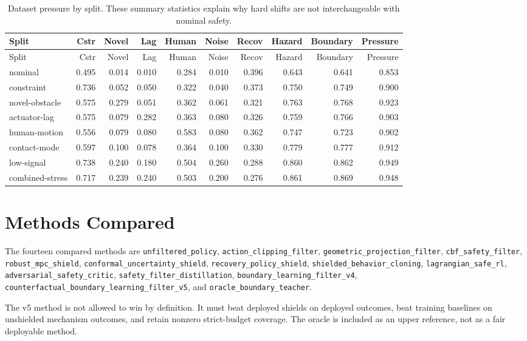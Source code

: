 \documentclass{article}
\begin{document}
\begingroup
\scriptsize
\begin{longtable}{@{}lrrrrrrrrr@{}}
\caption{Dataset pressure by split. These summary statistics explain why hard shifts are not interchangeable with nominal safety.}\\
\toprule
Split & Cstr & Novel & Lag & Human & Noise & Recov & Hazard & Boundary & Pressure \\
\midrule
\endfirsthead
\toprule
Split & Cstr & Novel & Lag & Human & Noise & Recov & Hazard & Boundary & Pressure \\
\midrule
\endhead
nominal & 0.495 & 0.014 & 0.010 & 0.284 & 0.010 & 0.396 & 0.643 & 0.641 & 0.853 \\
constraint & 0.736 & 0.052 & 0.050 & 0.322 & 0.040 & 0.373 & 0.750 & 0.749 & 0.900 \\
novel-obstacle & 0.575 & 0.279 & 0.051 & 0.362 & 0.061 & 0.321 & 0.763 & 0.768 & 0.923 \\
actuator-lag & 0.575 & 0.079 & 0.282 & 0.363 & 0.080 & 0.326 & 0.759 & 0.766 & 0.903 \\
human-motion & 0.556 & 0.079 & 0.080 & 0.583 & 0.080 & 0.362 & 0.747 & 0.723 & 0.902 \\
contact-mode & 0.597 & 0.100 & 0.078 & 0.364 & 0.100 & 0.330 & 0.779 & 0.777 & 0.912 \\
low-signal & 0.738 & 0.240 & 0.180 & 0.504 & 0.260 & 0.288 & 0.860 & 0.862 & 0.949 \\
combined-stress & 0.717 & 0.239 & 0.240 & 0.503 & 0.200 & 0.276 & 0.861 & 0.869 & 0.948 \\
\bottomrule
\end{longtable}
\endgroup


\section{Methods Compared}
The fourteen compared methods are \texttt{unfiltered\_policy}, \texttt{action\_clipping\_filter}, \texttt{geometric\_projection\_filter}, \texttt{cbf\_safety\_filter}, \texttt{robust\_mpc\_shield}, \texttt{conformal\_uncertainty\_shield}, \texttt{recovery\_policy\_shield}, \texttt{shielded\_behavior\_cloning}, \texttt{lagrangian\_safe\_rl}, \texttt{adversarial\_safety\_critic}, \texttt{safety\_filter\_distillation}, \texttt{boundary\_learning\_filter\_v4}, \texttt{counterfactual\_boundary\_learning\_filter\_v5}, and \texttt{oracle\_boundary\_teacher}.

The v5 method is not allowed to win by definition. It must beat deployed shields on deployed outcomes, beat training baselines on unshielded mechanism outcomes, and retain nonzero strict-budget coverage. The oracle is included as an upper reference, not as a fair deployable method.
\end{document}
